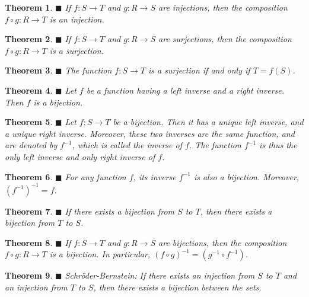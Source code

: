 \documentclass[a4paper]{article}
\newtheorem{mytheorem}{Theorem}
\numberwithin{mytheorem}{section}
\numberwithin{mydef}{section}
\numberwithin{axiom}{section}
\numberwithin{example}{section}
\newcommand{\done}{$\blacksquare$ }
\begin{document}
\begin{mytheorem} \done If $f: S \rightarrow T$ and $g: R \rightarrow S$ are injections, then the composition $f \circ g: R \rightarrow T$ is an injection.
\end{mytheorem}

\begin{mytheorem} \done If $f: S \rightarrow T$ and $g: R \rightarrow S$ are surjections, then the composition $f \circ g: R \rightarrow T$ is a surjection.
\end{mytheorem}

\begin{mytheorem} \done The function $f: S \rightarrow T$ is a surjection if and only if $T = f(S)$. \end{mytheorem}

\begin{mytheorem} \done Let $f$ be a function having a left inverse and a right inverse. Then $f$ is a bijection. \end{mytheorem}

\begin{mytheorem} \done Let $f: S \rightarrow T$ be a bijection. Then it has a unique left inverse, and a unique right inverse. Moreover, these two inverses are the same function, and are denoted by $f^{-1}$, which is called the inverse of $f$. The function $f^{-1}$ is thus the only left inverse and only right inverse of $f$. \end{mytheorem}

\begin{mytheorem} \done For any function $f$, its inverse $f^{-1}$ is also a bijection. Moreover, $(f^{-1})^{-1} = f$. \end{mytheorem}

\begin{mytheorem} \done If there exists a bijection from $S$ to $T$, then there exists a bijection from $T$ to $S$. \end{mytheorem}

\begin{mytheorem} \done If $f: S \rightarrow T$ and $g: R \rightarrow S$ are bijections, then the composition $f \circ g: R \rightarrow T$ is a bijection. In particular, $(f \circ g)^{-1} = (g^{-1} \circ f^{-1})$.
\end{mytheorem}

\begin{mytheorem} \done Schr{\"o}der-Bernstein: If there exists an injection from $S$ to $T$ and an injection from $T$ to $S$, then there exists a bijection between the sets. \end{mytheorem}
\end{document}
